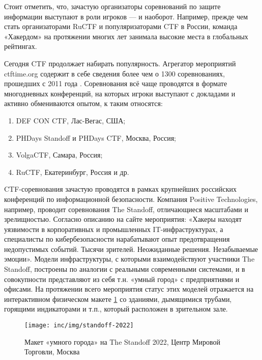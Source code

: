 Стоит отметить, что, зачастую организаторы соревнований по защите информации выступают в роли игроков --- и наоборот. Например, прежде чем стать организаторами RuCTF и популяризаторами CTF в России, команда «Хакердом» на протяжении многих лет занимала высокие места в глобальных рейтингах\cite{HackerdomRating}.

Сегодня CTF продолжает набирать популярность. Агрегатор мероприятий ctftime.org содержит в себе сведения более чем о 1300 соревнованиях, прошедших с 2011 года \cite{CTFTimeTotal}. Соревнования всё чаще проводятся в формате многодневных конференций, на которых игроки выступают с докладами и активно обмениваются опытом, к таким относятся:
\begin{enumerate}
  \item DEF CON CTF, Лас-Вегас, США;
  \item PHDays Standoff и PHDays CTF, Москва, Россия;
  \item VolgaCTF, Самара, Россия;
  \item RuCTF, Екатеринбург, Россия и др.
\end{enumerate}

CTF-соревнования зачастую проводятся в рамках крупнейших российских конференций по информационной безопасности. Компания Positive Technologies, например, проводит соревнования The Standoff, отличающиеся масштабами и зрелищностью. Согласно описанию на сайте мероприятия: «Хакеры находят уязвимости в корпоративных и промышленных IT-инфраструктурах, а специалисты по кибербезопасности нарабатывают опыт предотвращения недопустимых событий. Тысячи зрителей. Неожиданные решения. Незабываемые эмоции»\cite{TheStandoff}. Модели инфраструктуры, с которыми взаимодействуют участники The Standoff, построены по аналогии с реальными современными системами, и в совокупности представляют из себя т.н. «умный город» с предприятиями и офисами. На протяжении всего мероприятия статус этих моделей отражается на интерактивном физическом макете \ref{fig:standoff-2022} со зданиями, дымящимися трубами, горящими индикаторами и т.п., который расположен в зрительном зале.

\begin{figure}
  \centering
  \texttt{[image: inc/img/standoff-2022]}
  \caption{Макет «умного города» на The Standoff 2022, Центр Мировой Торговли, Москва}
  \label{fig:standoff-2022}
\end{figure}

